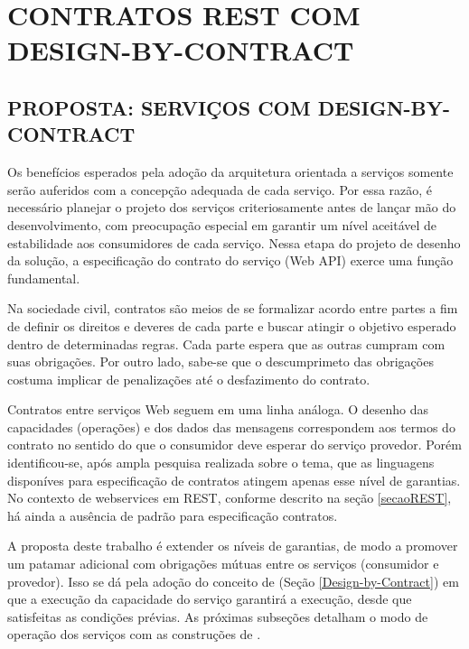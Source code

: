 \chapter{CONTRATOS REST COM DESIGN-BY-CONTRACT}


\section{PROPOSTA: SERVIÇOS COM DESIGN-BY-CONTRACT}
\label{PropostaServicoDbC}
\vspace{-6mm}

Os benefícios esperados pela adoção da arquitetura orientada a serviços
somente serão auferidos com a concepção adequada de cada serviço. 
Por essa razão, é necessário planejar o projeto dos serviços criteriosamente
antes de lançar mão do desenvolvimento, com preocupação especial em garantir
um nível aceitável de estabilidade aos consumidores de cada serviço.
Nessa etapa do projeto de desenho da solução, a especificação do contrato do
serviço (Web API) exerce uma função fundamental. 

Na sociedade civil, contratos são meios de se formalizar acordo entre partes a
fim de definir os direitos e deveres de cada parte e buscar atingir o
objetivo esperado dentro de determinadas regras. Cada parte espera que as outras
cumpram com suas obrigações.
Por outro lado, sabe-se que o descumprimeto das obrigações costuma implicar de
penalizações até o desfazimento do contrato. 

Contratos entre serviços Web seguem em uma linha análoga. O desenho das
capacidades (operações) e dos dados das mensagens correspondem aos
termos do contrato no sentido do que o consumidor deve esperar do serviço
provedor. Porém identificou-se, após ampla pesquisa realizada sobre o tema, que
as linguagens disponíves para especificação de contratos atingem apenas esse
nível de garantias. No contexto de webservices em REST, conforme descrito na
seção \ref{secaoREST}, há ainda a ausência de padrão para especificação
contratos.

A proposta deste trabalho é extender os níveis de garantias, de modo a promover
um patamar adicional com obrigações mútuas entre os serviços (consumidor e
provedor). Isso se dá pela adoção do conceito de \designbycontract{} (Seção 
\ref{Design-by-Contract}) em que a execução da capacidade do serviço garantirá 
a execução, desde que satisfeitas as condições prévias. As próximas subseções 
detalham o modo de operação dos serviços com as construções de \designbycontract{}.

